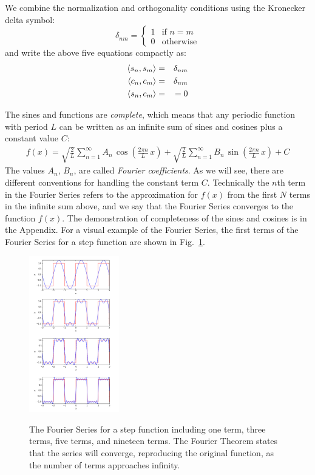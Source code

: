 \documentclass[12pt,oneside]{book}
\begin{document}
We combine the normalization and orthogonality conditions using the Kronecker delta symbol:
\begin{displaymath}
\delta_{nm} =  
\left\{
	\begin{array}{ll}
		1  & \mbox{if } n=m \\
		0 & \mbox{otherwise}
	\end{array}
\right.
\end{displaymath}
and write the above five equations compactly as:
\begin{eqnarray}
\braket{s_n, s_m} &=&  \delta_{nm} \nonumber \\
\braket{c_n, c_m} &=&  \delta_{nm} \label{eqn:coscos} \\
\braket{s_n, c_m} &=&  = 0 \nonumber
\end{eqnarray}

The sines and functions are {\em complete}, which means that any periodic function with period $L$ can be written as an infinite sum of sines and cosines plus a constant value $C$:
\begin{eqnarray}
f(x) = \sqrt{\frac{2}{L}} \sum_{n=1}^{\infty}  A_n \, \cos\left(\frac{2\pi n}{L} \, x \right) + \sqrt{\frac{2}{L}}  \sum_{n=1}^{\infty} B_n \, \sin\left(\frac{2\pi n}{L} \, x \right) + C\label{eqn:bigseries}
\end{eqnarray}
The values $A_n$, $B_n$,  are called {\em Fourier coefficients}.   As we will see, there are different conventions for handling the constant term $C$.  Technically the $n$th term in the Fourier Series refers to the approximation for $f(x)$ from the first $N$ terms in the infinite sum above, and we say that the Fourier Series converges to the function $f(x)$.  The demonstration of completeness of the sines and cosines is in the Appendix.  For a visual example of the Fourier Series, the first terms of the Fourier Series for a step function are shown in Fig.~\ref{fig:fall}.  

\begin{figure}[thb]
\begin{center}
{\includegraphics[width=0.35\textwidth]{figs/fsall.pdf}}
\end{center}
\caption{\label{fig:fall} The Fourier Series for a step function including one term, three terms, five terms, and nineteen terms.  The Fourier Theorem states that the series will converge, reproducing the original function, as the number of terms approaches infinity.}
\end{figure}
\end{document}
